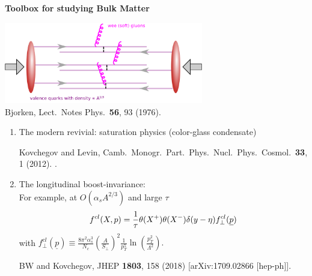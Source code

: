 \documentclass[9pt,a4paper,unknownkeysallowed,xcolor=dvipsnames,aspectratio=43]{beamer}
\begin{document}
%
%
\begin{frame}{\bf\huge Toolbox for studying Bulk Matter}	\vspace{4mm}
\begin{center}
\includegraphics[width=0.65\textwidth]{fig/Bjorken}\\
{\tiny  {\color{teablue}
Bjorken,
  Lect.\ Notes Phys.\  {\bf 56}, 93 (1976).
  }}
\end{center}
\begin{enumerate}
\item{The modern revivial: saturation physics (color-glass condensate)}\\
\begin{center}
    {\tiny  {\color{teablue}
  Kovchegov and Levin,
  Camb.\ Monogr.\ Part.\ Phys.\ Nucl.\ Phys.\ Cosmol.\  {\bf 33}, 1 (2012).
.
  }}
\end{center}
\item{The longitudinal boost-invariance:}\\
\vspace{1mm}
{\small For example, at $O(\alpha_s A^{2/3})$ and large $\tau$}
\begin{align}
  f^{cl}(X,p)=\frac{1}{\tau} \theta(X^+) \theta(X^-) \delta(y-\eta)
  f_\perp^{cl}(\underline{p})
  \notag
\end{align}
with
$f_\perp^{cl}(\underline{p})\equiv\frac{8\pi^2\alpha_s^3}{N_c}\left(\frac{A}{S_\perp}\right)^2
  \frac{1}{p_T^5}\ln\left(\frac{p_T^2}{\Lambda^2}\right).$
\begin{center}
    {\tiny  {\color{teablue}
  BW and Kovchegov,
  JHEP {\bf 1803}, 158 (2018)
  [arXiv:1709.02866 [hep-ph]].
}}
\end{center}
\end{enumerate}
\end{frame}
\end{document}
